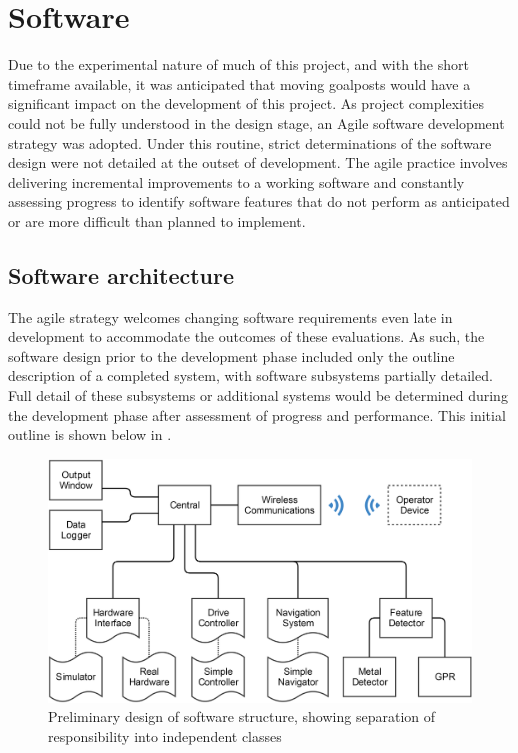 \documentclass[main.tex]{subfiles}
\begin{document}
\section{Software}
Due to the experimental nature of much of this project, and with the short timeframe available, it was anticipated that moving goalposts would have a significant impact on the development of this project. As project complexities could not be fully understood in the design stage, an Agile software development strategy was adopted. Under this routine, strict determinations of the software design were not detailed at the outset of development. The agile practice involves delivering incremental improvements to a working software and constantly assessing progress to identify software features that do not perform as anticipated or are more difficult than planned to implement.

\subsection{Software architecture}
 The agile strategy welcomes changing software requirements even late in development to accommodate the outcomes of these evaluations.
As such, the software design prior to the development phase included only the outline description of a completed system, with software subsystems partially detailed. Full detail of these subsystems or additional systems would be determined during the development phase after assessment of progress and performance. This initial outline is shown below in .

\begin{figure}[!ht]
\includegraphics[width=1\textwidth]{4-DetailedDesign/fyp_structure__1_.png}
\centering
\caption[Preliminary software structure design]{Preliminary design of software structure, showing separation of responsibility into independent classes} 
\end{figure}
\end{document}
